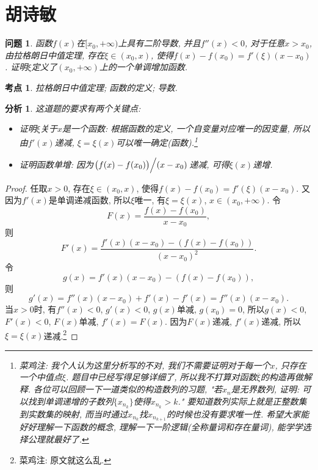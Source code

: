 \documentclass[a4paper, 12pt]{ctexart}
\theoremstyle{plain}
\newtheorem{problem}{问题}
\theoremstyle{nonumberplain}
\newtheorem{proof}{证明}
\newtheorem{analysis}{分析}
\newtheorem{category}{考点}
\newcommand{\lr}[3]{\left#1#3\right#2}
\newcommand{\lmr}[5]{\left#1#4\middle#2#5\right#3}
\newcommand{\efootnote}[1]{\footnote{菜鸡注: #1}}
\begin{document}
\section{胡诗敏}

\begin{problem}
    函数$f(x)$在$[x_0, +\infty)$上具有二阶导数, 并且$f''(x)<0$, 对于任意$x>x_0$, 由拉格朗日中值定理, 存在$\xi\in (x_0, x)$, 使得$f(x)-f(x_0)=f'(\xi)(x-x_0)$. 证明$\xi$定义了$(x_0, +\infty)$上的一个单调增加函数.
\end{problem}
\begin{category}
    拉格朗日中值定理; 函数的定义; 导数.
\end{category}
\begin{analysis}
    这道题的要求有两个关键点:
    \begin{itemize}
        \item 证明$\xi$关于$x$是一个函数: 根据函数的定义, 一个自变量对应唯一的因变量, 所以由$f'(x)$递减, $\xi=\xi(x)$可以唯一确定(函数).\efootnote{我个人认为这里分析写的不对, 我们不需要证明对于每一个$x$, 只存在一个中值点$\xi$. 题目中已经写得足够详细了, 所以我不打算对函数$\overline{\xi}$的构造再做解释. 各位可以回顾一下一道类似的构造数列的习题, "若$x_n$是无界数列, 证明: 可以找到单调递增的子数列$\{x_{n_k}\}$使得$x_{n_k} > k$." 要知道数列实际上就是正整数集到实数集的映射, 而当时通过$x_{n_k}$找$x_{n_{k+1}}$的时候也没有要求唯一性. 希望大家能好好理解一下函数的概念, 理解一下一阶逻辑(全称量词和存在量词), 能学学选择公理就最好了.}
        \item 证明函数单增: 因为$\lmr./.{\lr(){f(x)-f(x_0)}}{\lr(){x-x_0}}$递减, 可得$\xi(x)$递增.
    \end{itemize}
\end{analysis}
\begin{proof}
    任取$x>0$, 存在$\xi\in(x_0, x)$, 使得$f(x)-f(x_0)=f'(\xi)(x-x_0)$. 又因为$f'(x)$是单调递减函数, 所以$\xi$唯一, 有$\xi=\xi(x)$, $x\in(x_0, +\infty)$. 令
    \begin{equation}
        F(x) = \frac{f(x)-f(x_0)}{x-x_0},
    \end{equation}
    则
    \begin{equation}
        F'(x) = \frac{f'(x)(x-x_0)- (f(x)-f(x_0))}{(x-x_0)^2}.
    \end{equation}
    令
    \begin{equation}
        g(x) = f'(x)(x-x_0)-(f(x)-f(x_0)),
    \end{equation}
    则
    \begin{equation}
        g'(x) = f''(x)(x-x_0)+f'(x)-f'(x) = f''(x)(x-x_0).
    \end{equation}
    当$x>0$时, 有$f''(x)<0$, $g'(x)<0$, $g(x)$单减, $g(x_0)=0$, 所以$g(x)<0$, $F'(x)<0$, $F(x)$单减, $f'(x) = F(x)$. 因为$F(x)$递减, $f'(x)$递减, 所以$\xi=\xi(x)$递减.\efootnote{原文就这么乱.}
\end{proof}
\end{document}
